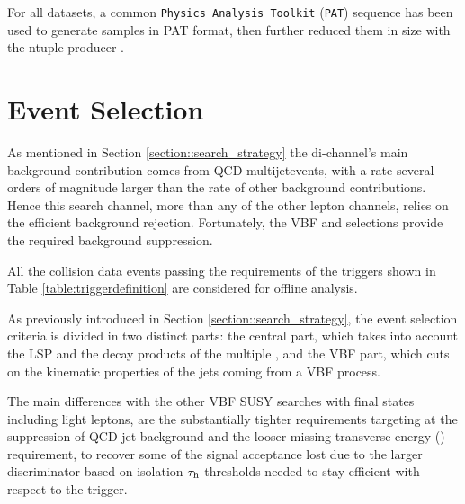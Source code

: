 For all datasets, a common \texttt{Physics Analysis Toolkit} (\texttt{PAT}) \cite{Adam:2010zza} sequence has been used to generate samples in PAT format, then further reduced them in size with the ntuple producer \cite{bib:thentuplemaker}.



\section{Event Selection}
\label{sec:eventselection}



As mentioned in Section \ref{section::search_strategy} the di-\hadtau channel's main background contribution comes from QCD multijetevents, with a rate several orders of magnitude larger than the rate of other background contributions. Hence this search channel, more than any of the other lepton channels, relies on the efficient background rejection. Fortunately, the VBF and \met selections provide the required background suppression.

All the collision data events passing the requirements of the triggers shown in Table \ref{table:triggerdefinition} are considered for offline analysis. 

As previously introduced in Section \ref{section::search_strategy}, the event selection criteria is divided in two distinct parts: the central part, which takes into account the LSP and the decay products of the multiple \hadtau, and the VBF part, which cuts on the kinematic properties of the jets coming from a VBF process. 

The main differences with the other VBF SUSY searches with final states including light leptons, are the substantially tighter \hadtau requirements targeting at the suppression of QCD jet background and the looser missing transverse energy (\met) requirement, to recover some of the signal acceptance lost due to the larger discriminator based on isolation $\tau_{\text{h}}$ \pt thresholds needed to stay efficient with respect to the trigger. 

